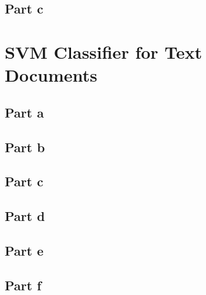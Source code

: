 \documentclass[paper=a4, fontsize=11pt]{scrartcl} %
\numberwithin{equation}{section} %
\numberwithin{figure}{section} %
\numberwithin{table}{section} %
\begin{document}
	\subsection{Part c}

	
	
	\section{SVM Classifier for Text Documents}
	
	\subsection{Part a}

	\subsection{Part b}
	
	\subsection{Part c}
	
	\subsection{Part d}
	
	\subsection{Part e}
	
	\subsection{Part f}
	
\end{document}
